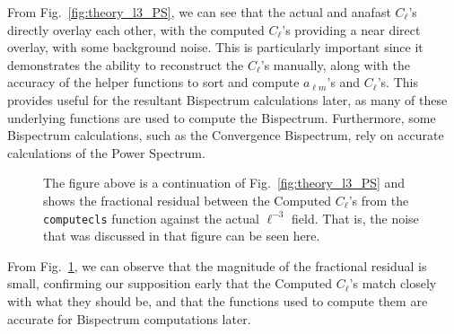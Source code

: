 \documentclass[11pt]{article}
\renewcommand{\_}[1]{\underline{ #1 }}
\newcommand{\us}{\textunderscore}
\begin{document}
{From Fig.~\ref{fig:theory_l3_PS}, we can see that the actual and anafast $C_{\ell}$'s directly overlay each other, with the computed $C_{\ell}$'s providing a near direct overlay, with some background noise. This is particularly important since it demonstrates the ability to reconstruct the $C_{\ell}$'s manually, along with the accuracy of the helper functions to sort and compute $a_{\ell m}$'s and $C_{\ell}$'s. This provides useful for the resultant Bispectrum calculations later, as many of these underlying functions are used to compute the Bispectrum. Furthermore, some Bispectrum calculations, such as the Convergence Bispectrum, rely on accurate calculations of the Power Spectrum.

\begin{figure}[H]
    \centering
    \caption{The figure above is a continuation of Fig.~\ref{fig:theory_l3_PS} and shows the fractional residual between the Computed $C_{\ell}$'s from the \texttt{compute\us cls} function against the actual $\ell^{-3}$ field. That is, the noise that was discussed in that figure can be seen here.}\label{fig:residual_cl}
\end{figure}

From Fig.~\ref{fig:residual_cl}, we can observe that the magnitude of the fractional residual is small, confirming our supposition early that the Computed $C_{\ell}$'s match closely with what they should be, and that the functions used to compute them are accurate for Bispectrum computations later.

}
\end{document}
